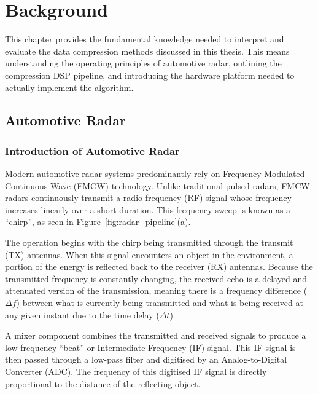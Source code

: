 \chapter{Background}
\label{ch:background}
This chapter provides the fundamental knowledge needed to interpret and evaluate the data compression methods discussed in this thesis. This means understanding the operating principles of automotive radar, outlining the compression DSP pipeline, and introducing the hardware platform needed to actually implement the algorithm.

\section{Automotive Radar}
\subsection{Introduction of Automotive Radar}
\label{sec:fmcw}
Modern automotive radar systems predominantly rely on Frequency-Modulated Continuous Wave (FMCW) technology. Unlike traditional pulsed radars, FMCW radars continuously transmit a radio frequency (RF) signal whose frequency increases linearly over a short duration. This frequency sweep is known as a ``chirp'', as seen in Figure~\ref{fig:radar_pipeline}(a).

The operation begins with the chirp being transmitted through the transmit (TX) antennas. When this signal encounters an object in the environment, a portion of the energy is reflected back to the receiver (RX) antennas. Because the transmitted frequency is constantly changing, the received echo is a delayed and attenuated version of the transmission, meaning there is a frequency difference ($\Delta f$) between what is currently being transmitted and what is being received at any given instant due to the time delay ($\Delta t$).

A mixer component combines the transmitted and received signals to produce a low-frequency ``beat'' or Intermediate Frequency (IF) signal. This IF signal is then passed through a low-pass filter and digitised by an Analog-to-Digital Converter (ADC). The frequency of this digitised IF signal is directly proportional to the distance of the reflecting object.

